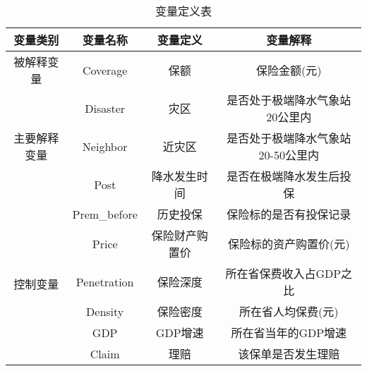 \begin{table}[H]
    \caption{变量定义表}\label{tab:var}
    \centering
    \begin{tabular}{@{}cccc@{}}
        \toprule
        变量类别                    & 变量名称         & 变量定义    & 变量解释                \\ \midrule
        被解释变量                   & Coverage     & 保额      & 保险金额(元)                \\ \midrule
        \multirow{3}{*}{主要解释变量} & Disaster     & 灾区      & 是否处于极端降水气象站20公里内    \\ \cmidrule(l){2-4}
                                & Neighbor     & 近灾区     & 是否处于极端降水气象站20-50公里内 \\ \cmidrule(l){2-4}
                                & Post         & 降水发生时间  & 是否在极端降水发生后投保        \\
        \midrule
        \multirow{6}{*}{控制变量}   & Prem\_before & 历史投保    & 保险标的是否有投保记录         \\ \cmidrule(l){2-4}
                                & Price        & 保险财产购置价 & 保险标的资产购置价(元)           \\ \cmidrule(l){2-4}
                                & Penetration         & 保险深度    & 所在省保费收入占GDP之比            \\ \cmidrule(l){2-4}
                                & Density         & 保险密度    & 所在省人均保费(元)           \\ \cmidrule(l){2-4}
                                & GDP         & GDP增速    & 所在省当年的GDP增速           \\ \cmidrule(l){2-4}
        & Claim       & 理赔    & 该保单是否发生理赔            \\
        \bottomrule
    \end{tabular}
\end{table}
